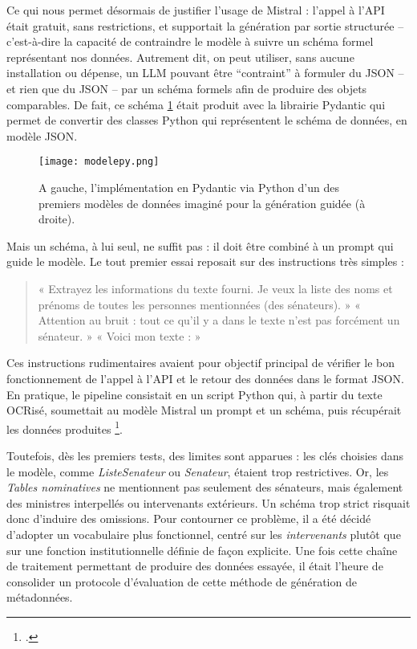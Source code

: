 Ce qui nous permet désormais de justifier l’usage de Mistral : l’appel à l’API était gratuit, sans restrictions, et supportait la génération par sortie structurée -- c’est-à-dire la capacité de contraindre le modèle à suivre un schéma formel représentant nos données. Autrement dit, on peut utiliser, sans aucune installation ou dépense, un LLM pouvant être \enquote{contraint} à formuler du JSON -- et rien que du JSON -- par un schéma formels afin de produire des objets comparables. De fait, ce schéma \ref{fig:modelepy} était produit avec la librairie Pydantic qui permet de convertir des classes Python qui représentent le schéma de données, en modèle JSON.

\begin{figure}[htbp]
\centering
\texttt{[image: modelepy.png]}
\caption{A gauche, l'implémentation en Pydantic via Python d'un des premiers modèles de données imaginé pour la génération guidée (à droite).}
\label{fig:modelepy}
\end{figure}

Mais un schéma, à lui seul, ne suffit pas : il doit être combiné à un prompt qui guide le modèle. Le tout premier essai reposait sur des instructions très simples :

\begin{quote}
« Extrayez les informations du texte fourni. Je veux la liste des noms et prénoms de toutes les personnes mentionnées (des sénateurs). »  
« Attention au bruit : tout ce qu’il y a dans le texte n’est pas forcément un sénateur. »  
« Voici mon texte : »

\end{quote}
Ces instructions rudimentaires avaient pour objectif principal de vérifier le bon fonctionnement de l’appel à l’API et le retour des données dans le format JSON. En pratique, le pipeline consistait en un script Python qui, à partir du texte OCRisé, soumettait au modèle Mistral un prompt et un schéma, puis récupérait les données produites \footcite[][]{pipeline_mezz}.

Toutefois, dès les premiers tests, des limites sont apparues : les clés choisies dans le modèle, comme \emph{ListeSenateur} ou \emph{Senateur}, étaient trop restrictives. Or, les \emph{Tables nominatives} ne mentionnent pas seulement des sénateurs, mais également des ministres interpellés ou intervenants extérieurs. Un schéma trop strict risquait donc d’induire des omissions. Pour contourner ce problème, il a été décidé d’adopter un vocabulaire plus fonctionnel, centré sur les \emph{intervenants} plutôt que sur une fonction institutionnelle définie de façon explicite. Une fois cette chaîne de traitement permettant de produire des données essayée, il était l'heure de consolider un protocole d'évaluation de cette méthode de génération de métadonnées.

